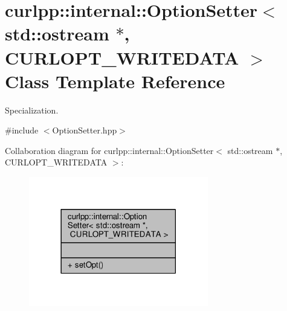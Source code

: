 \hypertarget{classcurlpp_1_1internal_1_1OptionSetter_3_01std_1_1ostream_01_5_00_01CURLOPT__WRITEDATA_01_4}{\section{curlpp\-:\-:internal\-:\-:Option\-Setter$<$ std\-:\-:ostream $\ast$, C\-U\-R\-L\-O\-P\-T\-\_\-\-W\-R\-I\-T\-E\-D\-A\-T\-A $>$ Class Template Reference}
\label{classcurlpp_1_1internal_1_1OptionSetter_3_01std_1_1ostream_01_5_00_01CURLOPT__WRITEDATA_01_4}
}


Specialization.  




{\ttfamily \#include $<$Option\-Setter.\-hpp$>$}



Collaboration diagram for curlpp\-:\-:internal\-:\-:Option\-Setter$<$ std\-:\-:ostream $\ast$, C\-U\-R\-L\-O\-P\-T\-\_\-\-W\-R\-I\-T\-E\-D\-A\-T\-A $>$\-:\nopagebreak
\begin{figure}[H]
\begin{center}
\leavevmode
\includegraphics[width=222pt]{classcurlpp_1_1internal_1_1OptionSetter_3_01std_1_1ostream_01_5_00_01CURLOPT__WRITEDATA_01_4__coll__graph}
\end{center}
\end{figure}
